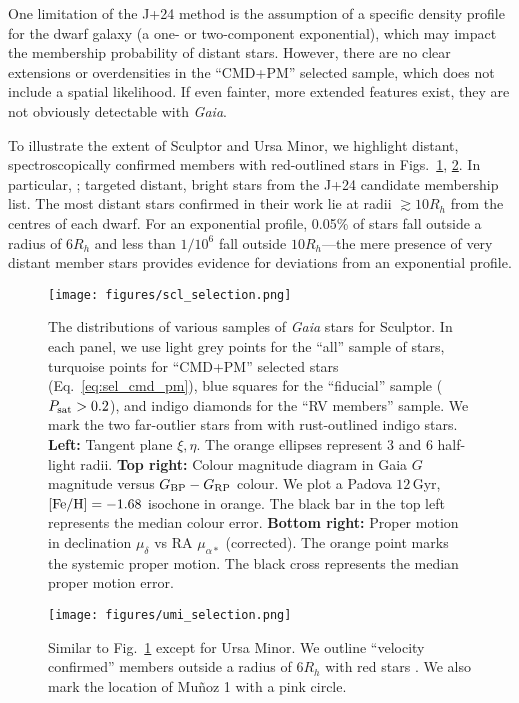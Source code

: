 One limitation of the J+24 method is the assumption of a specific
density profile for the dwarf galaxy (a one- or two-component
exponential), which may impact the membership probability of distant
stars. However, there are no clear extensions or overdensities in the
``CMD+PM'' selected sample, which does not include a spatial likelihood.
If even fainter, more extended features exist, they are not obviously
detectable with \emph{Gaia}.

To illustrate the extent of Sculptor and Ursa Minor, we highlight
distant, spectroscopically confirmed members with red-outlined stars in
Figs.~\ref{fig:scl_selection}, \ref{fig:umi_selection}. In particular,
\citet{sestito+2023a}; \citet{sestito+2023b} targeted distant, bright
stars from the J+24 candidate membership list. The most distant stars
confirmed in their work lie at radii \(\gtrsim 10 R_h\) from the centres
of each dwarf. For an exponential profile, 0.05\% of stars fall outside
a radius of \(6R_h\) and less than \(1/10^6\) fall outside
\(10R_h\)---the mere presence of very distant member stars provides
evidence for deviations from an exponential profile.

\begin{figure}
\centering
\texttt{[image: figures/scl\_selection.png]}
\caption[Sculptor sample selection]{The distributions of various samples
of \emph{Gaia} stars for Sculptor. In each panel, we use light grey
points for the ``all'' sample of stars, turquoise points for ``CMD+PM''
selected stars (Eq.~\ref{eq:sel_cmd_pm}), blue squares for the
``fiducial'' sample (\(P_{\rm sat} > 0.2\)), and indigo diamonds for the
``RV members'' sample. We mark the two far-outlier stars from
\citet{sestito+2023a} with rust-outlined indigo stars. \textbf{Left:}
Tangent plane \(\xi, \eta\). The orange ellipses represent 3 and 6
half-light radii. \textbf{Top right:} Colour magnitude diagram in Gaia
\(G\) magnitude versus \(G_{\rm BP} - G_{\rm RP}\) colour. We plot a
Padova \(12\,\)Gyr, \({\rm [Fe/H] }=-1.68\) isochone in orange. The
black bar in the top left represents the median colour error.
\textbf{Bottom right:} Proper motion in declination \(\mu_\delta\) vs RA
\(\mu_{\alpha*}\) (corrected). The orange point marks the systemic
\citet{MV2020b} proper motion. The black cross represents the median
proper motion error.}\label{fig:scl_selection}
\end{figure}

\begin{figure}
\centering
\texttt{[image: figures/umi\_selection.png]}
\caption[Ursa Minor sample selection]{Similar to
Fig.~\ref{fig:scl_selection} except for Ursa Minor. We outline
``velocity confirmed'' members outside a radius of \(6R_h\) with red
stars \citep[from][]{sestito+2023b, pace+2020, spencer+2018}. We also
mark the location of Muñoz 1 with a pink
circle.}\label{fig:umi_selection}
\end{figure}

